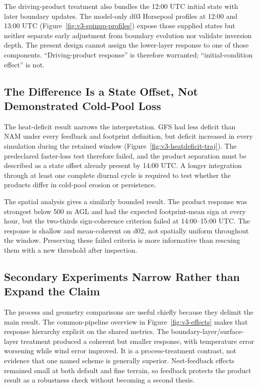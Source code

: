 \documentclass[air,article,submit,moreauthors]{Definitions/mdpi}
\begin{document}
The driving-product treatment also bundles the 12:00 UTC initial state with later boundary updates.
The model-only d03 Horsepool profiles at 12:00 and 13:00 UTC (Figure~\ref{fig:v3-spinup-profiles}) expose those supplied states but neither separate early adjustment from boundary evolution nor validate inversion depth.
The present design cannot assign the lower-layer response to one of those components.
``Driving-product response'' is therefore warranted; ``initial-condition effect'' is not.

\subsection{The Difference Is a State Offset, Not Demonstrated Cold-Pool Loss}
\label{sec:v3-disc-spatial}

The heat-deficit result narrows the interpretation.
GFS had less deficit than NAM under every feedback and footprint definition, but deficit increased in every simulation during the retained window (Figure~\ref{fig:v3-heatdeficit-traj}).
The predeclared faster-loss test therefore failed, and the product separation must be described as a state offset already present by 14:00 UTC.
A longer integration through at least one complete diurnal cycle is required to test whether the products differ in cold-pool erosion or persistence.

The spatial analysis gives a similarly bounded result.
The product response was strongest below 500 m AGL and had the expected footprint-mean sign at every hour, but the two-thirds sign-coherence criterion failed at 14:00--15:00 UTC.
The response is shallow and mean-coherent on d02, not spatially uniform throughout the window.
Preserving these failed criteria is more informative than rescuing them with a new threshold after inspection.

\subsection{Secondary Experiments Narrow Rather than Expand the Claim}
\label{sec:v3-disc-process}

The process and geometry comparisons are useful chiefly because they delimit the main result.
The common-pipeline overview in Figure~\ref{fig:v3-effects} makes that response hierarchy explicit on the shared metrics.
The boundary-layer/surface-layer treatment produced a coherent but smaller response, with temperature error worsening while wind error improved.
It is a process-treatment contrast, not evidence that one named scheme is generally superior.
Nest-feedback effects remained small at both default and fine terrain, so feedback protects the product result as a robustness check without becoming a second thesis.
\end{document}
